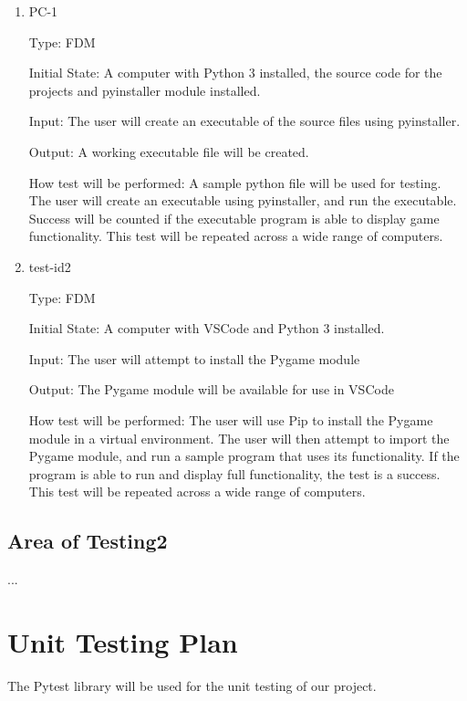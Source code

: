 \documentclass[12pt, titlepage]{article}
\begin{document}
\begin{enumerate}

\item{PC-1\\}

Type: FDM
					
Initial State: A computer with Python 3 installed, the source code for the projects and pyinstaller module installed.
					
Input: The user will create an executable of the source files using pyinstaller.
					
Output: A working executable file will be created.
					
How test will be performed: A sample python file will be used for testing. The user will create an executable using pyinstaller, and run the executable. Success will be counted if the executable program is able to display game functionality. This test will be repeated across a wide range of computers.
					
\item{test-id2\\}

Type: FDM
					
Initial State: A computer with VSCode and Python 3 installed.
					
Input: The user will attempt to install the Pygame module
					
Output: The Pygame module will be available for use in VSCode
					
How test will be performed: The user will use Pip to install the Pygame module in a virtual environment. The user will then attempt to import the Pygame module, and run a sample program that uses its functionality. If the program is able to run and display full functionality, the test is a success. This test will be repeated across a wide range of computers.

\end{enumerate}

\subsection{Area of Testing2}

...
	
\section{Unit Testing Plan}

The Pytest library will be used for the unit testing of our project.
		
\end{document}
